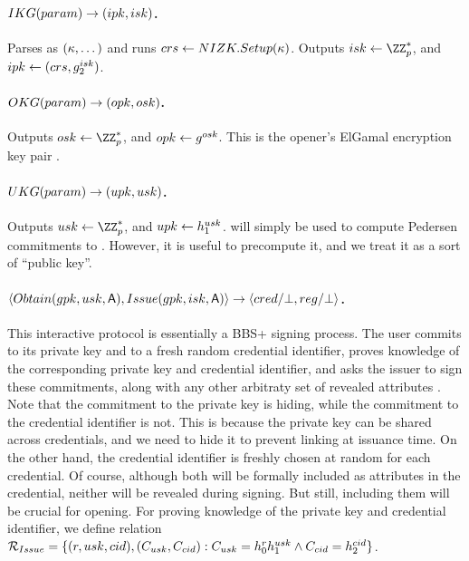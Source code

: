\paragraph{$IKG(param) \rightarrow (ipk,isk)$.} %
Parses \parm as $(\kappa,\dots)$ and runs $crs \gets NIZK.Setup(\kappa)$.
Outputs $\isk \gets \ZZ^*_p$, and $ipk \gets (crs,g_2^{isk})$.

\paragraph{$OKG(param) \rightarrow (opk,osk)$.} %
Outputs $\osk \gets \ZZ^*_p$, and $opk \gets g^{osk}$. This is the
opener's ElGamal encryption key pair \needcite.

\paragraph{$UKG(param) \rightarrow (upk,usk)$.} %
Outputs $\usk \gets \ZZ^*_p$, and $upk \gets h_1^{usk}$. \upk will
simply be used to compute Pedersen commitments \needcite to \usk. However,
it is useful to precompute it, and we treat it as a sort of ``public key''.

\paragraph{$\langle Obtain(gpk,usk,\mathsf{A}),Issue(gpk,isk,\mathsf{A}) \rangle
  \rightarrow \langle cred/\bot,reg/\bot \rangle$.} %
This interactive protocol is essentially a BBS+ signing  process. The user
commits to its private key and to a fresh random credential identifier, proves
knowledge of the corresponding private key and credential identifier, and
asks the issuer to sign these commitments, along with any other arbitraty set
of revealed attributes \Attrs. Note that the commitment to the private key is
hiding, while the commitment to the credential identifier is not. This is
because the private key can be shared across credentials, and we need to hide
it to prevent linking at issuance time. On the other hand, the credential
identifier is freshly chosen at random for each credential. Of course, although
both will be formally included as attributes in the credential, neither will be
revealed during signing. But still, including them will be crucial for opening.
For proving knowledge of the private key and credential identifier, we define
relation $\mathcal{R}_{Issue} = \lbrace (r, usk, cid),
(C_{usk},C_{cid}): C_{usk} = h_0^rh_1^{usk} \land C_{cid} =
h_2^{cid}\rbrace$.

